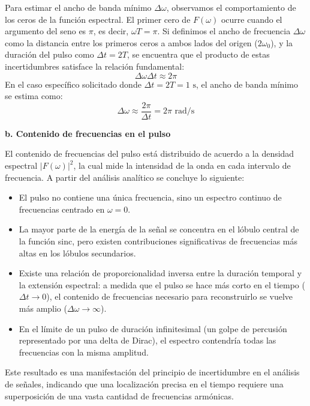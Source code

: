 \documentclass[a4paper]{article}
\begin{document}
Para estimar el ancho de banda mínimo $\Delta\omega$, observamos el comportamiento de los ceros de la función espectral. El primer cero de $F(\omega)$ ocurre cuando el argumento del seno es $\pi$, es decir, $\omega T = \pi$. Si definimos el ancho de frecuencia $\Delta\omega$ como la distancia entre los primeros ceros a ambos lados del origen ($2\omega_0$), y la duración del pulso como $\Delta t = 2T$, se encuentra que el producto de estas incertidumbres satisface la relación fundamental:
$$\Delta\omega \Delta t \approx 2\pi$$
En el caso específico solicitado donde $\Delta t = 2T = 1 \text{ s}$, el ancho de banda mínimo se estima como:
$$\Delta\omega \approx \frac{2\pi}{\Delta t} = 2\pi \text{ rad/s}$$

\textbf{b. Contenido de frecuencias en el pulso}

El contenido de frecuencias del pulso está distribuido de acuerdo a la densidad espectral $|F(\omega)|^2$, la cual mide la intensidad de la onda en cada intervalo de frecuencia. A partir del análisis analítico se concluye lo siguiente:

\begin{itemize}
    \item El pulso no contiene una única frecuencia, sino un espectro continuo de frecuencias centrado en $\omega = 0$.
    \item La mayor parte de la energía de la señal se concentra en el lóbulo central de la función sinc, pero existen contribuciones significativas de frecuencias más altas en los lóbulos secundarios.
    \item Existe una relación de proporcionalidad inversa entre la duración temporal y la extensión espectral: a medida que el pulso se hace más corto en el tiempo ($\Delta t \to 0$), el contenido de frecuencias necesario para reconstruirlo se vuelve más amplio ($\Delta\omega \to \infty$).
    \item En el límite de un pulso de duración infinitesimal (un golpe de percusión representado por una delta de Dirac), el espectro contendría todas las frecuencias con la misma amplitud.
\end{itemize}

Este resultado es una manifestación del principio de incertidumbre en el análisis de señales, indicando que una localización precisa en el tiempo requiere una superposición de una vasta cantidad de frecuencias armónicas.





 
\end{document}
